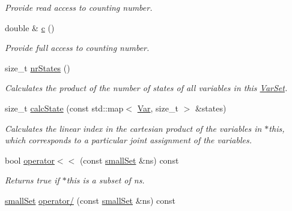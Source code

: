 \begin{CompactItemize}
\begin{CompactList}\small\item\em Provide read access to counting number. \item\end{CompactList}\item 
\hypertarget{classdai_1_1Region_d4ec2f311244ec4290496505b4fdef76}{
double \& \hyperlink{classdai_1_1Region_d4ec2f311244ec4290496505b4fdef76}{c} ()}
\label{classdai_1_1Region_d4ec2f311244ec4290496505b4fdef76}

\begin{CompactList}\small\item\em Provide full access to counting number. \item\end{CompactList}\item 
\hypertarget{classdai_1_1VarSet_adfd4d43a9a521f8738e9507682440d3}{
size\_\-t \hyperlink{classdai_1_1VarSet_adfd4d43a9a521f8738e9507682440d3}{nrStates} ()}
\label{classdai_1_1VarSet_adfd4d43a9a521f8738e9507682440d3}

\begin{CompactList}\small\item\em Calculates the product of the number of states of all variables in this \hyperlink{classdai_1_1VarSet}{VarSet}. \item\end{CompactList}\item 
size\_\-t \hyperlink{classdai_1_1VarSet_a6fd950faa6961c9786e96b04ee2dee1}{calcState} (const std::map$<$ \hyperlink{classdai_1_1Var}{Var}, size\_\-t $>$ \&states)
\begin{CompactList}\small\item\em Calculates the linear index in the cartesian product of the variables in $\ast$this, which corresponds to a particular joint assignment of the variables. \item\end{CompactList}\item 
\hypertarget{classdai_1_1smallSet_6cd0a2ffbbad14020999cf11199e1e95}{
bool \hyperlink{classdai_1_1smallSet_6cd0a2ffbbad14020999cf11199e1e95}{operator$<$$<$} (const \hyperlink{classdai_1_1smallSet}{smallSet} \&ns) const }
\label{classdai_1_1smallSet_6cd0a2ffbbad14020999cf11199e1e95}

\begin{CompactList}\small\item\em Returns true if $\ast$this is a subset of ns. \item\end{CompactList}\item 
\hypertarget{classdai_1_1smallSet_daa0dd9b812a6254226965227c0d4828}{
\hyperlink{classdai_1_1smallSet}{smallSet} \hyperlink{classdai_1_1smallSet_daa0dd9b812a6254226965227c0d4828}{operator/} (const \hyperlink{classdai_1_1smallSet}{smallSet} \&ns) const }
\label{classdai_1_1smallSet_daa0dd9b812a6254226965227c0d4828}


\end{CompactItemize}
